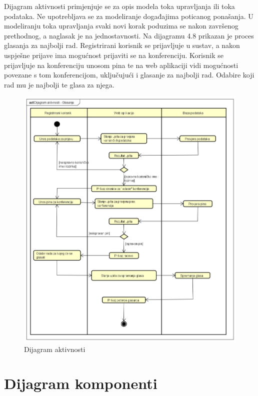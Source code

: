			Dijagram aktivnosti primjenjuje se za opis modela toka upravljanja ili toka podataka. Ne upotrebljava se za modeliranje događajima poticanog ponašanja. U modeliranju toka upravljanja svaki novi korak poduzima se nakon završenog prethodnog, a naglasak je na jednostavnosti. Na dijagramu 4.8 prikazan je proces glasanja za najbolji rad. Registrirani korisnik se prijavljuje u sustav, a nakon uspješne prijave ima mogućnost prijaviti se na konferenciju. Korisnik se prijavljuje na konferenciju unosom pina te na web aplikaciji vidi mogućnosti povezane s tom konferencijom, uključujući i glasanje za najbolji rad. Odabire koji rad mu je najbolji te glasa za njega. 
			
			\begin{figure}[H]
				\includegraphics[scale=0.4]{dijagrami/dijagram_aktivnosti.png}%
			 	\centering
			 	\caption{Dijagram aktivnosti}
			 	\label{fig:promjene8.1}
			 \end{figure}
			 
			
			\eject
		\section{Dijagram komponenti}
		

